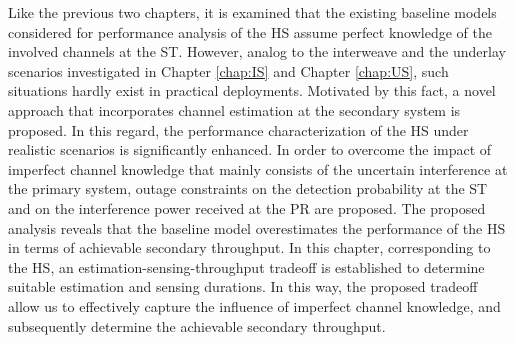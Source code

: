Like the previous two chapters, it is examined that the existing baseline models considered for performance analysis of the HS assume perfect knowledge of the involved channels at the ST. However, analog to the interweave and the underlay scenarios investigated in Chapter \ref{chap:IS} and Chapter \ref{chap:US}, such situations hardly exist in practical deployments. Motivated by this fact, a novel approach that incorporates channel estimation at the secondary system is proposed. In this regard, the performance characterization of the HS under realistic scenarios is significantly enhanced. In order to overcome the impact of imperfect channel knowledge that mainly consists of the uncertain interference at the primary system, outage constraints on the detection probability at the ST and on the interference power received at the PR are proposed. The proposed analysis reveals that the baseline model overestimates the performance of the HS in terms of achievable secondary throughput. In this chapter, corresponding to the HS, an estimation-sensing-throughput tradeoff is established to determine suitable estimation and sensing durations. In this way, the proposed tradeoff allow us to effectively capture the influence of imperfect channel knowledge, and subsequently determine the achievable secondary throughput. 

